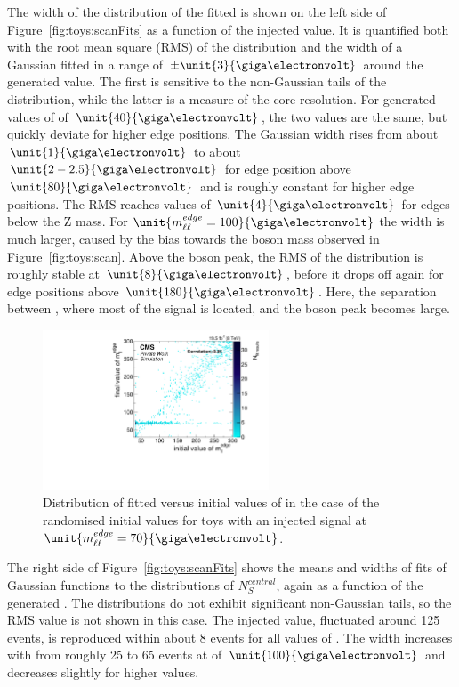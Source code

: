 The width of the distribution of the fitted \mlledge is shown on the left side of Figure~\ref{fig:toys:scanFits} as a function of the injected value. It is quantified both with the root mean square (RMS) of the distribution and the width of a Gaussian fitted in a range of $\pm\unit{3}{\giga\electronvolt}$ around the generated value. The first is sensitive to the non-Gaussian tails of the distribution, while the latter is a measure of the core resolution. For generated values of \mlledge of $\unit{40}{\giga\electronvolt}$, the two values are the same, but quickly deviate for higher edge positions. The Gaussian width rises from about $\unit{1}{\giga\electronvolt}$ to about $\unit{2-2.5}{\giga\electronvolt}$ for edge position above $\unit{80}{\giga\electronvolt}$ and is roughly constant for higher edge positions. The RMS reaches values of $\unit{4}{\giga\electronvolt}$ for edges below the Z mass. For $\unit{\mlledge=100}{\giga\electronvolt}$ the width is much larger, caused by the bias towards the \Z boson mass observed in Figure~\ref{fig:toys:scan}. Above the \Z boson peak, the RMS of the distribution is roughly stable at $\unit{8}{\giga\electronvolt}$, before it drops off again for edge positions above $\unit{180}{\giga\electronvolt}$. Here, the separation between \mlledge, where most of the signal is located, and the \Z boson peak becomes large.

\begin{figure}[hbp]
  \centering

    \includegraphics[width=0.6\textwidth]{plots/results/fit/toyResults/fittedM0vsinitialM0_signalInjectedM70N125_NegSig.pdf}
  \caption{Distribution of fitted versus initial values of \mlledge in the case of the randomised initial values for toys with an injected signal at $\unit{\mlledge = 70}{\giga\electronvolt}$.}
  \label{fig:toys:randM0Signal}
\end{figure}

The right side of Figure~\ref{fig:toys:scanFits} shows the means and widths of fits of Gaussian functions to the distributions of $N_{S}^{central}$, again as a function of the generated \mlledge. The distributions do not exhibit significant non-Gaussian tails, so the RMS value is not shown in this case. The injected value, fluctuated around 125 events, is reproduced within about 8 events for all values of \mlledge. The width increases with \mlledge from roughly 25 to 65 events at \mlledge of $\unit{100}{\giga\electronvolt}$ and decreases slightly for higher values.

